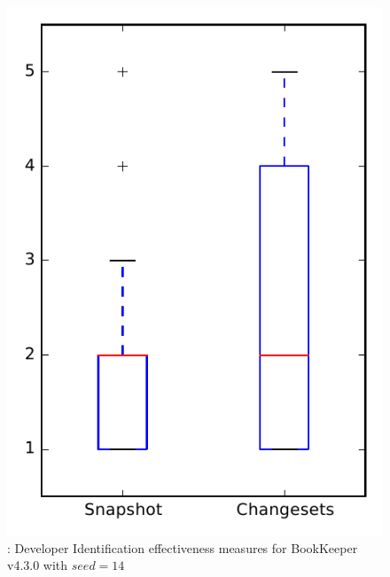 
\begin{figure}
\centering
\includegraphics[height=0.4\textheight]{figures/dit_seed/rq1_bookkeeper_14}
\caption{\rtwo: Developer Identification effectiveness measures for BookKeeper v4.3.0 with $seed=14$}
\label{fig:dit_seed:rq1:bookkeeper}
\end{figure}
